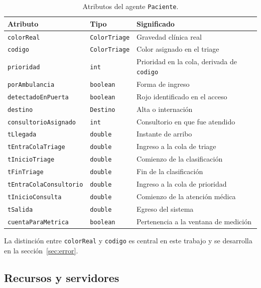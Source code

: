 \begin{table}[H]
\centering
\begin{tabular}{lll}
\toprule
\textbf{Atributo} & \textbf{Tipo} & \textbf{Significado} \\
\midrule
\texttt{colorReal}            & \texttt{ColorTriage} & Gravedad clínica real \\
\texttt{codigo}               & \texttt{ColorTriage} & Color asignado en el triage \\
\texttt{prioridad}            & \texttt{int}         & Prioridad en la cola, derivada de \texttt{codigo} \\
\texttt{porAmbulancia}        & \texttt{boolean}     & Forma de ingreso \\
\texttt{detectadoEnPuerta}    & \texttt{boolean}     & Rojo identificado en el acceso \\
\texttt{destino}              & \texttt{Destino}     & Alta o internación \\
\texttt{consultorioAsignado}  & \texttt{int}         & Consultorio en que fue atendido \\
\texttt{tLlegada}             & \texttt{double}      & Instante de arribo \\
\texttt{tEntraColaTriage}     & \texttt{double}      & Ingreso a la cola de triage \\
\texttt{tInicioTriage}        & \texttt{double}      & Comienzo de la clasificación \\
\texttt{tFinTriage}           & \texttt{double}      & Fin de la clasificación \\
\texttt{tEntraColaConsultorio}& \texttt{double}      & Ingreso a la cola de prioridad \\
\texttt{tInicioConsulta}      & \texttt{double}      & Comienzo de la atención médica \\
\texttt{tSalida}              & \texttt{double}      & Egreso del sistema \\
\texttt{cuentaParaMetrica}    & \texttt{boolean}     & Pertenencia a la ventana de medición \\
\bottomrule
\end{tabular}
\caption{Atributos del agente \texttt{Paciente}.}
\end{table}

La distinción entre \texttt{colorReal} y \texttt{codigo} es central en este
trabajo y se desarrolla en la sección~\ref{sec:error}.

\subsection{Recursos y servidores}

